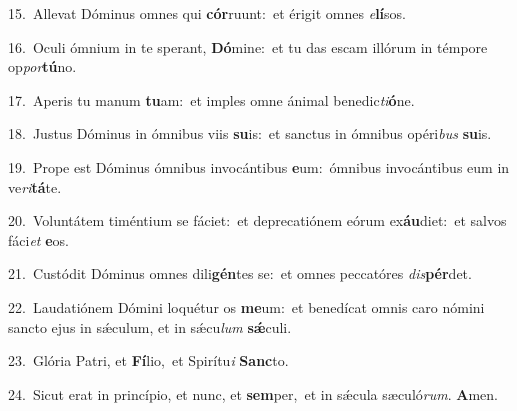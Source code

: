 {\numbfont\textcolor{\numbcolor}{15.}}~Allevat Dóminus omnes qui \textbf{cór}\-ruunt:~\star et érigit omnes \textit{e}\-\textbf{lí}sos.\par
{\numbfont\textcolor{\numbcolor}{16.}}~Oculi ómnium in te sperant, \textbf{Dó}\-mine:~\star et tu das escam illórum in témpore op\-\textit{por}\-\textbf{tú}no.\par
{\numbfont\textcolor{\numbcolor}{17.}}~Aperis tu manum \textbf{tu}\-am:~\star et imples omne ánimal benedic\-\textit{ti}\-\textbf{ó}ne.\par
{\numbfont\textcolor{\numbcolor}{18.}}~Justus Dóminus in ómnibus viis \textbf{su}\-is:~\star et sanctus in ómnibus opéri\textit{bus} \textbf{su}\-is.\par
{\numbfont\textcolor{\numbcolor}{19.}}~Prope est Dóminus ómnibus invocántibus \textbf{e}\-um:~\star ómnibus invocántibus eum in ve\-\textit{ri}\-\textbf{tá}te.\par
{\numbfont\textcolor{\numbcolor}{20.}}~Voluntátem timéntium se fáciet:~\dagger et deprecatiónem eórum ex\-\textbf{áu}\-diet:~\star et salvos fáci\textit{et} \textbf{e}\-os.\par
{\numbfont\textcolor{\numbcolor}{21.}}~Custódit Dóminus omnes dili\-\textbf{gén}\-tes se:~\star et omnes peccatóres \textit{dis}\-\textbf{pér}det.\par
{\numbfont\textcolor{\numbcolor}{22.}}~Laudatiónem Dómini loquétur os \textbf{me}\-um:~\star et benedícat omnis caro nómini sancto ejus in sǽculum, et in sǽcu\textit{lum} \textbf{sǽ}\-culi.\par
{\numbfont\textcolor{\numbcolor}{23.}}~Glória Patri, et \textbf{Fí}\-lio,~\star et Spirítu\textit{i} \textbf{Sanc}\-to.\par
{\numbfont\textcolor{\numbcolor}{24.}}~Sicut erat in princípio, et nunc, et \textbf{sem}\-per,~\star et in sǽcula sæculó\-\textit{rum}\-. \textbf{A}\-men.\par
